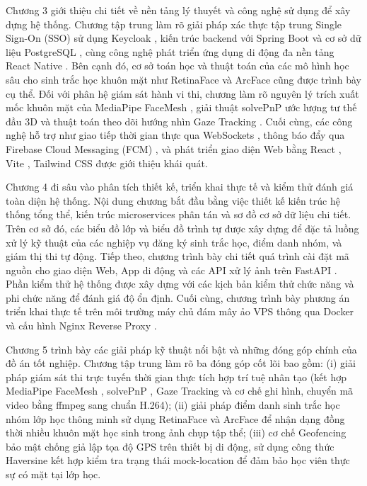 \documentclass[../DoAn.tex]{subfiles}
\begin{document}
Chương 3 giới thiệu chi tiết về nền tảng lý thuyết và công nghệ sử dụng để xây dựng hệ thống. Chương tập trung làm rõ giải pháp xác thực tập trung Single Sign-On (SSO) sử dụng Keycloak \cite{keycloak2026}, kiến trúc backend với Spring Boot \cite{spring_boot_docs2026} và cơ sở dữ liệu PostgreSQL \cite{postgresql_docs2026}, cùng công nghệ phát triển ứng dụng di động đa nền tảng React Native \cite{react_native_docs2026}. Bên cạnh đó, cơ sở toán học và thuật toán của các mô hình học sâu cho sinh trắc học khuôn mặt như RetinaFace \cite{Deng_2020_CVPR} và ArcFace \cite{Deng_2019_CVPR} cũng được trình bày cụ thể. Đối với phân hệ giám sát hành vi thi, chương làm rõ nguyên lý trích xuất mốc khuôn mặt của MediaPipe FaceMesh \cite{Lugaresi2019MediaPipe}, giải thuật solvePnP \cite{Lepetit2009EPnP} ước lượng tư thế đầu 3D và thuật toán theo dõi hướng nhìn Gaze Tracking \cite{kaundinya2026inbrowser}. Cuối cùng, các công nghệ hỗ trợ như giao tiếp thời gian thực qua WebSockets \cite{fette2011websocket}, thông báo đẩy qua Firebase Cloud Messaging (FCM) \cite{fcm2026}, và phát triển giao diện Web bằng React \cite{react_docs2026}, Vite \cite{vite_docs2026}, Tailwind CSS \cite{tailwindcss_docs2026} được giới thiệu khái quát.

Chương 4 đi sâu vào phân tích thiết kế, triển khai thực tế và kiểm thử đánh giá toàn diện hệ thống. Nội dung chương bắt đầu bằng việc thiết kế kiến trúc hệ thống tổng thể, kiến trúc microservices phân tán \cite{newman2021buildingmicroservices} và sơ đồ cơ sở dữ liệu chi tiết. Trên cơ sở đó, các biểu đồ lớp và biểu đồ trình tự được xây dựng để đặc tả luồng xử lý kỹ thuật của các nghiệp vụ đăng ký sinh trắc học, điểm danh nhóm, và giám thị thi tự động. Tiếp theo, chương trình bày chi tiết quá trình cài đặt mã nguồn cho giao diện Web, App di động và các API xử lý ảnh trên FastAPI \cite{fastapi_docs2026}. Phần kiểm thử hệ thống được xây dựng với các kịch bản kiểm thử chức năng và phi chức năng để đánh giá độ ổn định. Cuối cùng, chương trình bày phương án triển khai thực tế trên môi trường máy chủ đám mây ảo VPS thông qua Docker \cite{docker_compose_docs2026} và cấu hình Nginx Reverse Proxy \cite{nginx_docs2026}.

Chương 5 trình bày các giải pháp kỹ thuật nổi bật và những đóng góp chính của đồ án tốt nghiệp. Chương tập trung làm rõ ba đóng góp cốt lõi bao gồm: (i) giải pháp giám sát thi trực tuyến thời gian thực tích hợp trí tuệ nhân tạo (kết hợp MediaPipe FaceMesh \cite{Lugaresi2019MediaPipe}, solvePnP \cite{Lepetit2009EPnP}, Gaze Tracking \cite{kaundinya2026inbrowser} và cơ chế ghi hình, chuyển mã video bằng ffmpeg sang chuẩn H.264); (ii) giải pháp điểm danh sinh trắc học nhóm lớp học thông minh sử dụng RetinaFace \cite{Deng_2020_CVPR} và ArcFace \cite{Deng_2019_CVPR} để nhận dạng đồng thời nhiều khuôn mặt học sinh trong ảnh chụp tập thể; (iii) cơ chế Geofencing bảo mật chống giả lập tọa độ GPS trên thiết bị di động, sử dụng công thức Haversine \cite{sinnott1984virtues} kết hợp kiểm tra trạng thái mock-location để đảm bảo học viên thực sự có mặt tại lớp học.
\end{document}
